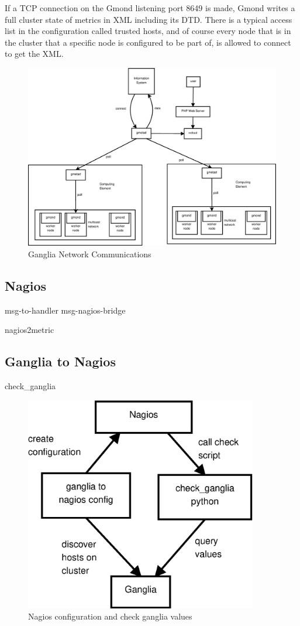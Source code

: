 If a TCP connection on the Gmond listening port 8649 is made, Gmond writes a full cluster state of metrics in XML including its DTD. There is a typical access list in the configuration called trusted hosts, and of course every node that is in the cluster that a specific node is configured to be part of, is allowed to connect to get the XML.

\begin{figure}[htb]
\centering
 \includegraphics[width=6in]{images/ganglia_data_flow.eps}
\caption{Ganglia Network Communications}
\label{figure:ganglia_network}
\end{figure}


\newpage

\subsection{Nagios}
msg-to-handler msg-nagios-bridge
\newpage

nagios2metric
\newpage

\subsection{Ganglia to Nagios}
check\_ganglia
\begin{figure}[htb]
\centering
 \includegraphics[width=4in]{images/nagios_check_ganglia.eps}
\caption{Nagios configuration and check ganglia values}
\label{figure:nagios_ganglia}
\end{figure}
\newpage

